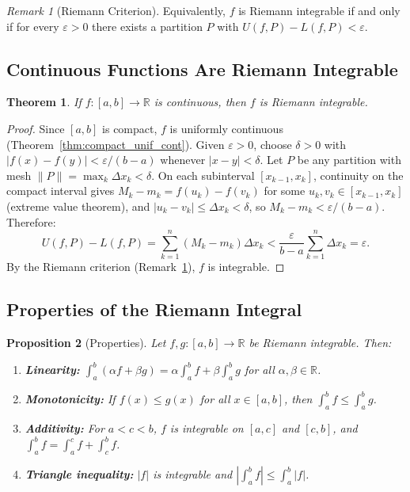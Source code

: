 \documentclass[11pt,a4paper]{article}
\theoremstyle{definition}
\theoremstyle{plain}
\newtheorem{theorem}{Theorem}[section]
\newtheorem{proposition}[theorem]{Proposition}
\theoremstyle{remark}
\newtheorem{remark}{Remark}[section]
\newcommand{\R}{\mathbb{R}}
\begin{document}
\begin{remark}[Riemann Criterion]
\label{rem:riemann_criterion}
Equivalently, $f$ is Riemann integrable if and only if for every $\varepsilon > 0$
there exists a partition $P$ with $U(f, P) - L(f, P) < \varepsilon$.
\end{remark}

\subsection{Continuous Functions Are Riemann Integrable}
\label{subsec:cont_integrable}

\begin{theorem}
\label{thm:cont_integrable}
If $f : [a, b] \to \R$ is continuous, then $f$ is Riemann integrable.
\end{theorem}

\begin{proof}
Since $[a, b]$ is compact, $f$ is uniformly continuous
(Theorem~\ref{thm:compact_unif_cont}). Given $\varepsilon > 0$, choose $\delta > 0$
with $|f(x) - f(y)| < \varepsilon/(b - a)$ whenever $|x - y| < \delta$. Let $P$
be any partition with mesh $\|P\| = \max_k \Delta x_k < \delta$. On each subinterval
$[x_{k-1}, x_k]$, continuity on the compact interval gives
$M_k - m_k = f(u_k) - f(v_k)$ for some $u_k, v_k \in [x_{k-1}, x_k]$
(extreme value theorem), and $|u_k - v_k| \le \Delta x_k < \delta$, so
$M_k - m_k < \varepsilon/(b-a)$. Therefore:
\[
U(f, P) - L(f, P) = \sum_{k=1}^n (M_k - m_k)\Delta x_k
< \frac{\varepsilon}{b - a} \sum_{k=1}^n \Delta x_k = \varepsilon.
\]
By the Riemann criterion (Remark~\ref{rem:riemann_criterion}), $f$ is integrable.
\end{proof}

\subsection{Properties of the Riemann Integral}
\label{subsec:riemann_props}

\begin{proposition}[Properties]
\label{prop:riemann_props}
Let $f, g : [a, b] \to \R$ be Riemann integrable. Then:
\begin{enumerate}[nosep,label=(\roman*)]
    \item \textbf{Linearity:} $\int_a^b (\alpha f + \beta g) = \alpha \int_a^b f
    + \beta \int_a^b g$ for all $\alpha, \beta \in \R$.
    \item \textbf{Monotonicity:} If $f(x) \le g(x)$ for all $x \in [a, b]$, then
    $\int_a^b f \le \int_a^b g$.
    \item \textbf{Additivity:} For $a < c < b$, $f$ is integrable on $[a, c]$ and
    $[c, b]$, and $\int_a^b f = \int_a^c f + \int_c^b f$.
    \item \textbf{Triangle inequality:} $|f|$ is integrable and
    $|\int_a^b f| \le \int_a^b |f|$.
\end{enumerate}
\end{proposition}
\end{document}
